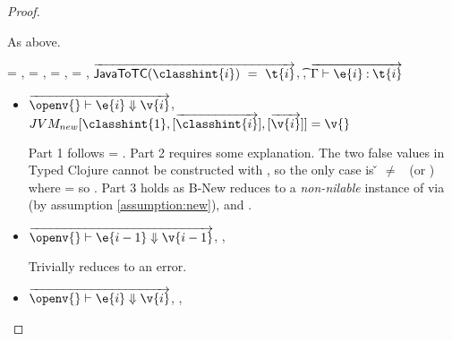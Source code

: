 \begin{lemma}
\begin{proof}
\begin{case}[T-Do]
\begin{itemize}
\begin{subcase}[BE-Do2]
        As above.
\end{subcase}
\end{itemize}
\end{case}

\begin{case}[T-NewStatic]
  \e{} = { {\classhint{}} 
                                                          {\class{}} {}},
  \object{} = \emptyobject{},
\thenprop{\prop{}} = \topprop{},
\elseprop{\prop{}} = \botprop{},
   $\overrightarrow{
\javatotc {\classhint{i}}
          {\t{i}}
          }$,
  \javatotc {\classhint{}}
            {\t{}},
            $
  \overrightarrow{
  \judgementtwo {\propenv{}}
                    {\hastype {\e{i}} {\t{i}}}
                  }$

\begin{itemize}
  \item[]
\begin{subcase}[B-New]
  $
  \overrightarrow{
  \opsem {\openv{}}
         {\e{i}}
         {\v{i}}
       }$,
         $\newjava {\classhint{1}}
                  {\overrightarrow{\classhint{i}}}
                  {\overrightarrow{\v{i}}}
                  {\v{}}$

Part 1 follows \object{} = \emptyobject{}.
Part 2 requires some explanation. The two false values in Typed Clojure
cannot be constructed with \newliteral, so the only case is \v{} $\not=$ \false\ (or \nil)
where \thenprop{\prop{}} = \topprop{} so \satisfies{\openv{}}{\thenprop{\prop{}}}.
Part 3 holds as B-New reduces to a \emph{non-nilable}
instance of \class{} via \newjavaliteral (by assumption \ref{assumption:new}), and \javatotc{\classhint{}}{\t{}}.
\end{subcase}
  \item[]

\begin{subcase}[BE-New1] $\overrightarrow{
  \opsem {\openv{}}
         {\e{i-1}}
         {\v{i-1}}
       }$,
  \opsem {\openv{}}
         {}
         {\errorvalv{}},
  \opsem {\openv{}} {\e{}} {\errorvalv{}}

        Trivially reduces to an error.

\end{subcase}
  \item[]

\begin{subcase}[BE-New2] 
  $\overrightarrow{
  \opsem {\openv{}}
         {\e{i}}
         {\v{i}}
       }$,
                  {}
                  {}
                  {\errorvalv{}},
        \opsem {\openv{}} {\e{}} {\errorvalv{}}


\end{subcase}
\end{itemize}
\end{case}
\end{proof}
\end{lemma}
